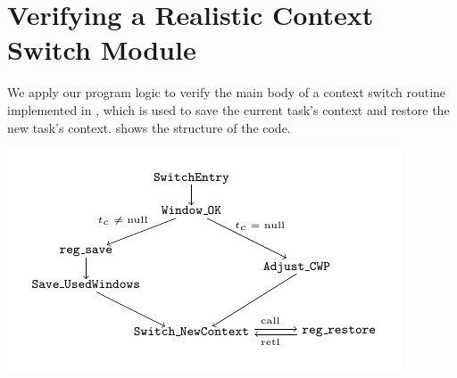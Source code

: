 \section{Verifying a Realistic Context Switch Module}
\label{sec:ctxswitch}

\indent
We apply our program logic to verify
the main body of a context switch routine implemented in \sparc,
which is used to save the current task's context and
restore the new task's context.
\Fig{\ref{fig:The Structure of Context Switch Module}}
shows the structure of the code.

\begin{center}
    \vspace*{-1.5em}
	\centering
	\includegraphics[scale=1.1]{picture//CodeStructure}
	\vspace{-0.4cm}
	\label{fig:The Structure of Context Switch Module}
\end{center}


